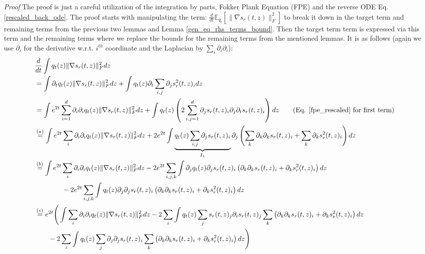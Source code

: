 \documentclass{article}
\begin{document}
\noindent
\textit{Proof} The proof is just a careful utilization of the integration by parts, Fokker Plank Equation (FPE) and the reverse ODE Eq. \ref{rescaled_back_ode}. {The proof starts with manipulating the term: $\frac{d}{dt}\mathbb{E}_{q_t}\left[\|\nabla s_r(t,z)\|_F^2\right]$ 
to break it down in the target term and remaining terms from the previous two lemmas and Lemma \ref{gen_eq_rhs_terms_bound}. Then the target term term is expressed via this term and the remaining terms where we replace the bounds for the remaining terms from the mentioned lemmas.  }
It is as follows (again we use $\partial_i$ for the derivative w.r.t. $i^{th}$ coordinate and the Laplacian by $\sum_i\partial_i\partial_i$):
\begin{align*}
    & \frac{d}{dt} \int q_t(z) \|\nabla s_r(t,z)\|^2_F dz \\
    &= \int \partial_t q_t(z) \|\nabla s_r(t,z)\|^2_F dz +  \int  q_t(z)  \partial_t\sum_{i,j}\partial_j s^2_r(t,z)_i  dz \\
    &= \int e^{2t}\sum_{i=1}^d\partial_i\partial_i q_t(z) \|\nabla s_r(t,z)\|^2_F dz +  \int  q_t(z)  \left(2 \sum_{i,j=1}^d \partial_j s_r(t,z)_i \partial_j \partial_t  s_r(t,z)_i \right) dz \tag{Eq. \ref{fpe_rescaled} for first term}\\
    &\overset{(a)}{=} \int e^{2t} \sum_i \partial_i\partial_i q_t(z) \|\nabla s_r(t,z)\|^2_F dz + 2e^{2t} \int  \underbrace{q_t(z) \sum_{i,j} \partial_j s_r(t,z)_i}_{I_1} \partial_j \left(\sum_k \partial_k\partial_k s_r(t,z)_i + \sum_k \partial_k s^2_r(t,z)_i \right)  dz \\
 &\overset{(b)}{=} \int e^{2t} \sum_i \partial_i\partial_i q_t(z) \|\nabla s_r(t,z)\|^2_F dz - 2e^{2t} \sum_{i,j,k} 
 \int  \partial_j q_t(z) \partial_j s_r(t,z)_i   \left( \partial_k \partial_k s_r(t,z)_i + \partial_k s^2_r(t,z)_i \right)  dz \\ 
 & \qquad \qquad - 2e^{2t} \sum_{i,j,k} 
 \int  q_t (z)  \partial_j \partial_j s_r(t,z)_i  \left( \partial_k \partial_k s_r(t,z)_i + \partial_k s^2_r(t,z)_i \right)  dz \\
 &\overset{(c)}{=} e^{2t} \Bigg(\int  \sum_i \partial_i\partial_i q_t(z) \|\nabla s_r(t,z)\|^2_F dz - 2 \sum_{i} 
 \int  q_t(z) \sum_j s_r(t,z)_j \partial_i s_r(t,z)_j   \sum_k\left( \partial_k \partial_k s_r(t,z)_i + \partial_k s^2_r(t,z)_i \right)  dz \qquad \\ 
 &  \qquad  - 2 \sum_{i} 
 \int  q_t (z) \sum_j \partial_j \partial_j s_r(t,z)_i  \sum_k \left( \partial_k \partial_k s_r(t,z)_i + \partial_k s^2_r(t,z)_i \right)  dz \Bigg) 
\end{align*}
\end{document}
